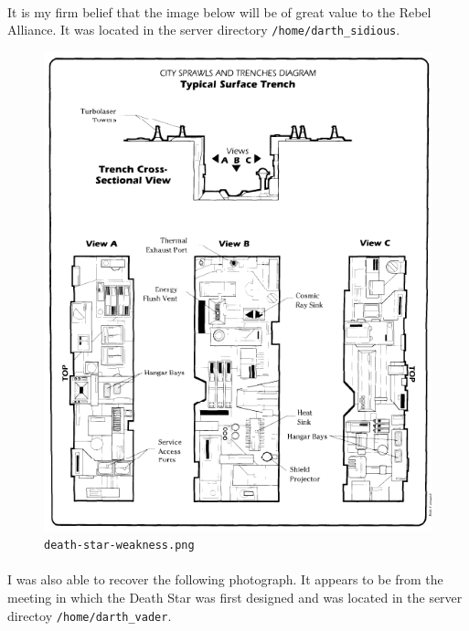 \documentclass{article}
\begin{document}
\paragraph{}
It is my firm belief that the image below will be of great value to the Rebel Alliance. It was located in the server directory \texttt{/home/darth\_sidious}.

\begin{figure}[H]
	\includegraphics[width=\linewidth]{resources/plans/death-star-weakness.png}
	\caption{\texttt{death-star-weakness.png}}
	\label{fig:death-star-weakness}
\end{figure}

\paragraph{}
I was also able to recover the following photograph. It appears to be from the meeting in which the Death Star was first designed and was located in the server directoy \texttt{/home/darth\_vader}.
\end{document}
